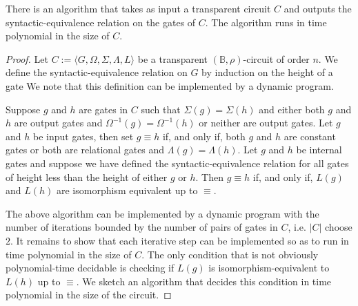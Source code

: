 \documentclass[../paper.tex]{subfiles}
\begin{document}
\begin{lem}
  There is an algorithm that takes as input a transparent circuit $C$ and
  outputs the syntactic-equivalence relation on the gates of $C$. The algorithm
  runs in time polynomial in the size of $C$.
  \label{lem:unique-labels-syntactic-equiv}
\end{lem}
\begin{proof}
  Let $C := \langle G, \Omega, \Sigma, \Lambda, L \rangle$ be a transparent
  $(\mathbb{B}, \rho)$-circuit of order $n$. We define the syntactic-equivalence
  relation on $G$ by induction on the height of a gate We note that this
  definition can be implemented by a dynamic program.
  
  Suppose $g$ and $h$ are gates in $C$ such that $\Sigma (g) = \Sigma(h)$ and
  either both $g$ and $h$ are output gates and $\Omega^{-1}(g) = \Omega^{-1}(h)$
  or neither are output gates. Let $g$ and $h$ be input gates, then set $g
  \equiv h$ if, and only if, both $g$ and $h$ are constant gates or both are
  relational gates and $\Lambda(g) = \Lambda (h)$. Let $g$ and $h$ be internal
  gates and suppose we have defined the syntactic-equivalence relation for all
  gates of height less than the height of either $g$ or $h$. Then $g \equiv h$
  if, and only if, $L(g)$ and $L(h)$ are isomorphism equivalent up to $\equiv$.



  The above algorithm can be implemented by a dynamic program with the number of
  iterations bounded by the number of pairs of gates in $C$, i.e. $\vert C
  \vert$ choose $2$. It remains to show that each iterative step can be
  implemented so as to run in time polynomial in the size of $C$. The only
  condition that is not obviously polynomial-time decidable is checking if
  $L(g)$ is isomorphism-equivalent to $L(h)$ up to $\equiv$. We sketch an
  algorithm that decides this condition in time polynomial in the size of the
  circuit.
  

\end{proof}
\end{document}
